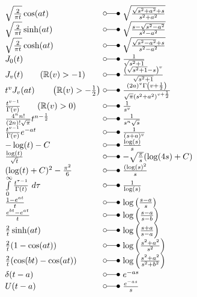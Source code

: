 \begin{footnotesize}
\[ \begin{array}{@{}l@{ ~ \laplace ~ }l@{}}
\sqrt{\frac{2}{\pi t}} \cos(at) &
    \sqrt{\frac{\sqrt{s^2 + a^2} + s}{s^2 + a^2}} \\
\sqrt{\frac{2}{\pi t}} \sinh(at) &
    \sqrt{\frac{s - \sqrt{s^2 - a^2}}{s^2 - a^2}} \\
\sqrt{\frac{2}{\pi t}} \cosh(at) &
    \sqrt{\frac{\sqrt{s^2 - a^2} + s}{s^2 - a^2}} \\
J_0(t) &
    \frac{1}{\sqrt{s^2 + 1}} \\
J_v(t) \qquad (\mathbb{R}(v) > -1) &
    \frac{\left(\sqrt{s^2 + 1} - s\right)^v}{\sqrt{s^2 + 1}} \\
t^v J_v(at) \qquad \left(\mathbb{R}(v) > -\frac{1}{2}\right) &
    \frac{(2 a)^v \Gamma\left(v + \frac{1}{2}\right)}{\sqrt{\pi}(s^2 + a^2)^{v + \frac{1}{2}}} \\
\frac{t^{v - 1}}{\Gamma(v)} \qquad (\mathbb{R}(v) > 0) &
    \frac{1}{s^v} \\
\frac{4^n n!}{(2 n)! \sqrt{\pi}} t^{n - \frac{1}{2}} &
    \frac{1}{s^n \sqrt{s}} \\
\frac{t^{v - 1}}{\Gamma(v)} e^{-at} &
    \frac{1}{(s + a)^v} \\
-\log(t) - C &
    \frac{\log(s)}{s} \\
\frac{\log(t)}{\sqrt{t}} &
    -\sqrt{\frac{\pi}{s}} (\log(4s) + C) \\
(\log(t) + C)^2 - \frac{\pi^2}{6} &
    \frac{(\log(s)^2}{s} \\
\int\limits_0^\infty \frac{t^{\tau - 1}}{\Gamma(t)} ~d\tau &
    \frac{1}{\log(s)} \\
\frac{1 - e^{at}}{t} &
    \log\left(\frac{s - a}{s}\right) \\
\frac{e^{bt} - e^{at}}{t} &
    \log\left(\frac{s - a}{s - b}\right) \\
\frac{2}{t} \sinh(at) &
    \log\left(\frac{s + a}{s - a}\right) \\
\frac{2}{t} (1 - \cos(at)) &
    \log\left(\frac{s^2 + a^2}{s^2}\right) \\
\frac{2}{t} (\cos(bt) - \cos(at)) &
    \log\left(\frac{s^2 + a^2}{s^2 + b^2}\right) \\
\delta(t - a) &
    e^{-as} \\
U(t - a) &
    \frac{e^{-as}}{s} \\
\end{array} \]


\end{footnotesize}
